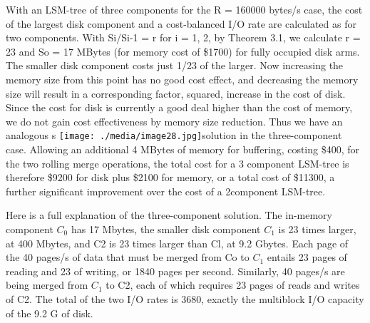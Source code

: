 \documentclass[a4paper,12pt,notitlepage,twoside,openright]{article}
\begin{document}
With an LSM-tree of three components for the R = 160000 bytes/s case,
the cost of the largest disk component and a cost-balanced I/O rate are
calculated as for two components. With Si/Si-1 = r for i = 1, 2, by
Theorem 3.1, we calculate r = 23 and So = 17 MBytes (for memory cost of
\$1700) for fully occupied disk arms. The smaller disk component costs
just 1/23 of the larger. Now increasing the memory size from this point
has no good cost effect, and decreasing the memory size will result in a
corresponding factor, squared, increase in the cost of disk. Since the
cost for disk is currently a good deal higher than the cost of memory,
we do not gain cost effectiveness by memory size reduction. Thus we have
an analogous s
\texttt{[image: ./media/image28.jpg]}solution
in the three-component case. Allowing an additional 4 MBytes of memory
for buffering, costing \$400, for the two rolling merge operations, the
total cost for a 3 component LSM-tree is therefore \$9200 for disk plus
\$2100 for memory, or a total cost of \$11300, a further significant
improvement over the cost of a 2component LSM-tree.

Here is a full explanation of the three-component solution. The
in-memory component \(C_0\) has 17 Mbytes, the smaller disk component \(C_1\) is
23 times larger, at 400 Mbytes, and C2 is 23 times larger than Cl, at
9.2 Gbytes. Each page of the 40 pages/s of data that must be merged from
Co to \(C_1\) entails 23 pages of reading and 23 of writing, or 1840 pages
per second. Similarly, 40 pages/s are being merged from \(C_1\) to C2, each
of which requires 23 pages of reads and writes of C2. The total of the
two I/O rates is 3680, exactly the multiblock I/O capacity of the 9.2 G
of disk.
\end{document}
